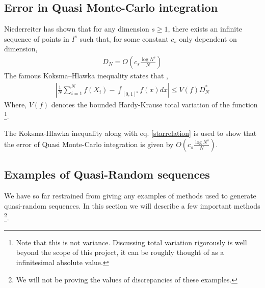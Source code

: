 \documentclass[12pt]{article}
\numberwithin{equation}{section}
\begin{document}
\subsection{Error in Quasi Monte-Carlo integration}
Niederreiter has shown \cite{Niederreiter1978QuasiMonteCM} that for any dimension $s \geq 1$, there exists an infinite sequence of points in $I^s$ such that, for some constant $c_s$ only dependent on dimension, 
\begin{align*}
    D_N = O \left(c_s \frac{\log N ^s}{N}\right)
\end{align*}
The famous Koksma–Hlawka inequality states that \cite{Niederreiter1978QuasiMonteCM},
\begin{align*}
    \left| \frac{1}{N} \sum_{i=1}^{N} f(X_i)-\int_{[0,1]^s} f(x) dx \right| \leq V(f) D_N^*
\end{align*}
Where, $V(f)$ denotes the bounded Hardy-Krause total variation of the function \footnote{Note that this is not variance. Discussing total variation rigorously is well beyond the scope of this project, it can be roughly thought of as a infinitesimal absolute value.\nopagebreak}.
\par The Koksma-Hlawka inequality along with eq. \ref{starrelation} is used to show that the error of Quasi Monte-Carlo integration is given by $O \left(c_s \frac{\log N ^s}{N}\right)$.
\subsection{Examples of Quasi-Random sequences}
We have so far restrained from giving any examples of methods used to generate quasi-random sequences. In this section we will describe a few important methods \footnote{We will not be proving the values of discrepancies of these examples.\nopagebreak}.
\end{document}
